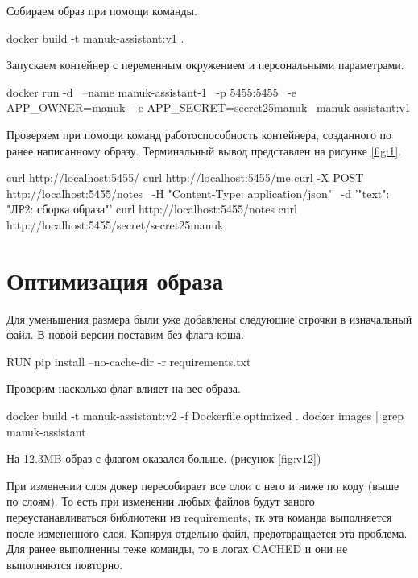 Собираем образ при помощи команды.

\begin{code}
docker build -t manuk-assistant:v1 .
\end{code}


Запускаем контейнер с переменным окружением и персональными параметрами.

\begin{code}
docker run -d \
  --name manuk-assistant-1 \
  -p 5455:5455 \
  -e APP_OWNER=manuk \
  -e APP_SECRET=secret25manuk \
  manuk-assistant:v1
\end{code}

Проверяем при помощи команд работоспособность контейнера, созданного по ранее написанному образу. Терминальный вывод представлен на рисунке \ref{fig:1}.

\begin{code}
curl http://localhost:5455/
curl http://localhost:5455/me
curl -X POST http://localhost:5455/notes \
  -H "Content-Type: application/json" \
  -d '{"text": "ЛР2: сборка образа"}'
curl http://localhost:5455/notes
curl http://localhost:5455/secret/secret25manuk
\end{code}


\section{Оптимизация образа}

Для уменьшения размера были уже добавлены следующие строчки в изначальный файл. В новой версии поставим без флага кэша.

\begin{code}
RUN pip install --no-cache-dir -r requirements.txt
\end{code}

Проверим насколько флаг влияет на вес образа.

\begin{code}
docker build -t manuk-assistant:v2 -f Dockerfile.optimized .
docker images | grep manuk-assistant
\end{code}

На 12.3MB образ с флагом оказался больше. (рисунок \ref{fig:v12})


При изменении слоя докер пересобирает все слои с него и ниже по коду (выше по слоям). То есть при изменении любых файлов будут заного переустанавливаться библиотеки из requirements, тк эта команда выполняется после измененного слоя. Копируя отдельно файл, предотвращается эта проблема. Для ранее выполненны теже команды, то в логах CACHED и они не выполняются повторно.  

